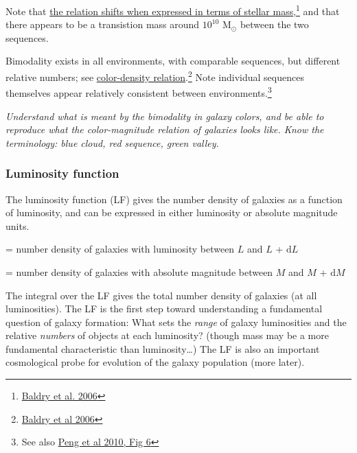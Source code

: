 \documentclass{article}
\newcommand{\test}[1]{%
    \begin{center}
        \colorbox{hl}{\parbox{0.9\textwidth}{\emph{\centering #1}}}
    \end{center}}
\begin{document}
Note that \href{http://astronomy.nmsu.edu/holtz/a555/images/mnr_11081_f7.htm}
{the relation shifts when expressed in terms of stellar mass},\footnote{\href{http://adsabs.harvard.edu/abs/2006MNRAS.373..469B}
    {Baldry et al. 2006}
}
and that there appears to be a transistion
mass around $10^{10}$ M$_{\odot}$ between the two sequences.

Bimodality exists in all environments, with comparable sequences, but different
relative numbers; see \href{http://astronomy.nmsu.edu/holtz/a555/resources/MNR_11081_f9.gif}
{color-density relation}.\footnote{\href{adsabs.harvard.edu/abs/2006MNRAS.373..469B}
{Baldry et al 2006}}
Note individual
sequences themselves appear relatively consistent between environments.\footnote{
See also \href{adsabs.harvard.edu/abs/2010ApJ...721..193P}
{Peng et al 2010, Fig 6}}

\test{Understand what is meant by the bimodality in galaxy colors, and be
able to reproduce what the color-magnitude relation of galaxies looks like.
Know the terminology: blue cloud, red sequence, green valley.}

\subsubsection{Luminosity function}
The luminosity function (LF) gives the number density of galaxies as a
function of luminosity, and can be expressed in either luminosity or
absolute magnitude units.
\begin{description}[labelwidth=3em, labelindent=0.25in]
    \item [$\Phi(L)$] = number density of galaxies with
        luminosity between $L$ and $L$ + $\mathrm{d}L$
    \item [$\Phi(M)$] = number density of galaxies with absolute
        magnitude between $M$ and $M$ + $\mathrm{d}M$
\end{description}
The integral over the LF gives the total number density of galaxies (at all
luminosities). The LF is the first step toward understanding a fundamental
question of galaxy formation: What sets the \emph{range} of galaxy luminosities
and the relative \emph{numbers} of objects at each luminosity? (though mass may
be a more fundamental characteristic than luminosity\ldots) The LF is also an
important cosmological probe for evolution of the galaxy population (more
later).
\end{document}
